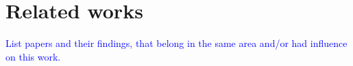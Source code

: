 \section{Related works}
\textcolor{blue}{List papers and their findings, that belong in the same area and/or had influence on this work.}